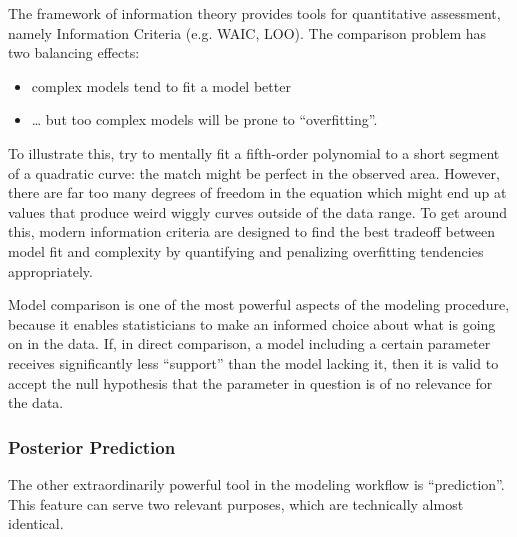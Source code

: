 The framework of information theory provides tools for quantitative assessment, namely Information Criteria (e.g. WAIC, LOO).
The comparison problem has two balancing effects:
\begin{itemize}
\item complex models tend to fit a model better
\item \ldots{} but too complex models will be prone to ``overfitting''.
\end{itemize}

To illustrate this, try to mentally fit a fifth-order polynomial to a short segment of a quadratic curve: the match might be perfect in the observed area.
However, there are far too many degrees of freedom in the equation which might end up at values that produce weird wiggly curves outside of the data range.
To get around this, modern information criteria are designed to find the best tradeoff between model fit and complexity by quantifying and penalizing overfitting tendencies appropriately.

Model comparison is one of the most powerful aspects of the modeling procedure, because it enables statisticians to make an informed choice about what is going on in the data.
If, in direct comparison, a model including a certain parameter receives significantly less ``support'' than the model lacking it, then it is valid to accept the null hypothesis that the parameter in question is of no relevance for the data.


\subsubsection{Posterior Prediction}
\label{workflow:prediction}
The other extraordinarily powerful tool in the modeling workflow is ``prediction''.
This feature can serve two relevant purposes, which are technically almost identical.


